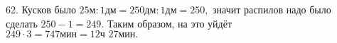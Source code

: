 62. Кусков было $25\text{м}:1\text{дм}=250\text{дм}:1\text{дм}=250,$ значит распилов надо было сделать $250-1=249.$ Таким образом, на это уйдёт $249\cdot3=747\text{мин}=12\text{ч }27\text{мин}.$\\
